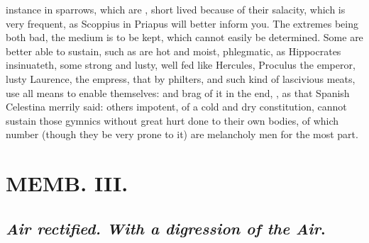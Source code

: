 {instance in sparrows, which are , short lived because of their salacity, which is very frequent, as Scoppius in Priapus will better inform you. The extremes being both bad, the medium is to be kept, which cannot easily be determined. Some are better able to sustain, such as are hot and moist, phlegmatic, as Hippocrates insinuateth, some strong and lusty, well fed like Hercules, Proculus the emperor, lusty Laurence,  the empress, that by philters, and such kind of lascivious meats, use all means to enable themselves: and brag of it in the end, , as that Spanish Celestina merrily said: others impotent, of a cold and dry constitution, cannot sustain those gymnics without great hurt done to their own bodies, of which number (though they be very prone to it) are melancholy men for the most part.

\chapter{ MEMB. III.}

\section{\emph{Air rectified. With a digression of the Air}.}

}
